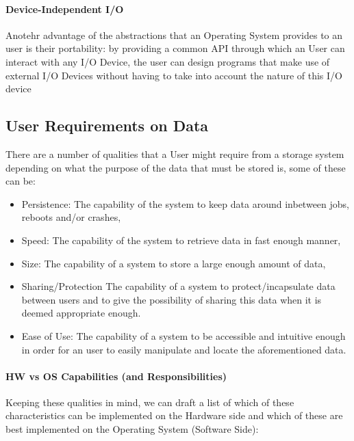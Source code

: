 \documentclass[openright, twoside]{report}
\theoremstyle{definition}
\theoremstyle{example}
\begin{document}
\paragraph{Device-Independent I/O}
Anotehr advantage of the abstractions that an Operating System provides to an user is their portability:
by providing a common API through which an User can interact with any I/O Device, the user can design programs 
that make use of external I/O Devices without having to take into account the nature of this I/O device 

\subsection{User Requirements on Data}
There are a number of qualities that a User might require from a storage system depending on 
what the purpose of the data that must be stored is, some of these can be:

\begin{itemize}
	\item Persistence: The capability of the system to keep data around inbetween jobs, reboots and/or crashes,
	\item Speed: The capability of the system to retrieve data in fast enough manner,
	\item Size: The capability of a system to store a large enough amount of data,
	\item Sharing/Protection The capability of a system to protect/incapsulate data between users and to 
	give the possibility of sharing this data when it is deemed appropriate enough.
	\item Ease of Use: The capability of a system to be accessible and intuitive enough in order for 
	an user to easily manipulate and locate the aforementioned data.
\end{itemize}

\paragraph{HW vs OS Capabilities (and Responsibilities)}
Keeping these qualities in mind, we can draft a list of which of these characteristics can be 
implemented on the Hardware side and which of these are best implemented on the Operating System (Software Side):
\end{document}
